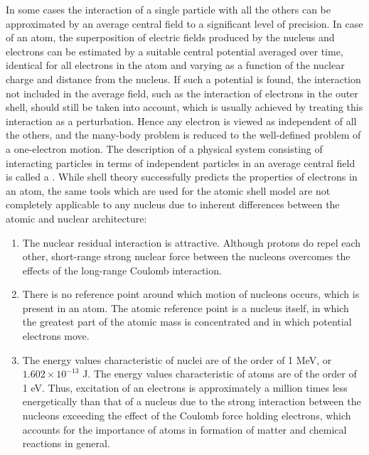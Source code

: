 In some cases the interaction of a single particle with all the others can be approximated by an average central field to a significant level of precision.\cite{shth} In case of an atom, the superposition of electric fields produced by the nucleus and electrons can be estimated by a suitable central potential averaged over time, identical for all electrons in the atom and varying as a function of the nuclear charge and distance from the nucleus.\cite{dem} If such a potential is found, the interaction not included in the average field, such as the interaction of electrons in the outer shell, should still be taken into account, which is usually achieved by treating this  interaction as a perturbation.\cite{shth} Hence any electron is viewed as independent of all the others, and the many-body problem is reduced to the well-defined problem of a one-electron motion. The description of a physical system consisting of interacting particles in terms of independent particles in an average central field is called a .\cite{shth} While shell theory successfully predicts the properties of electrons in an atom, the same tools which are used for the atomic shell model are not completely applicable to any nucleus due to inherent differences between the atomic and nuclear architecture:
\begin{enumerate}
\item The nuclear residual interaction is  attractive. Although protons do repel each other, short-range strong nuclear force between the nucleons overcomes the effects of the long-range Coulomb interaction.
\item There is no  reference point around which motion of nucleons occurs, which is present in an atom. The atomic reference point is a nucleus itself, in which the greatest part of the atomic mass is concentrated and in which potential electrons move. 
\item The energy values characteristic of nuclei are of the order of 1 MeV, or $1.602\times10^{-13}$ J. The energy values characteristic of atoms are of the order of 1 eV. Thus, excitation of an electrons is approximately a million times less energetically  than that of a nucleus due to the strong interaction between the nucleons exceeding the effect of the Coulomb force holding electrons, which accounts for the importance of atoms in formation of matter and chemical reactions in general.
\end{enumerate}

